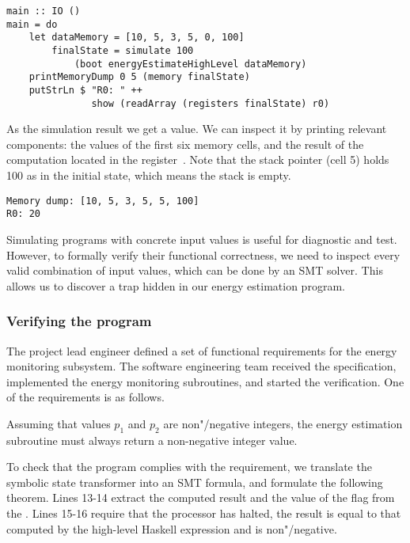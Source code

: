 \begin{verbatim}
main :: IO ()
main = do
    let dataMemory = [10, 5, 3, 5, 0, 100]
        finalState = simulate 100
            (boot energyEstimateHighLevel dataMemory)
    printMemoryDump 0 5 (memory finalState)
    putStrLn $ "R0: " ++
               show (readArray (registers finalState) r0)
\end{verbatim}

\noindent
As the simulation result we get a  value. We can inspect it by
printing relevant components: the values of the first six memory cells, and the
result of the computation located in the register~. Note that the stack
pointer (cell 5) holds 100 as in the initial state, which means the stack is empty.


\begin{verbatim}
Memory dump: [10, 5, 3, 5, 5, 100]
R0: 20
\end{verbatim}


Simulating programs with concrete input values is useful for diagnostic and test.
However, to formally verify their functional correctness, we need to inspect
every valid combination of input values, which can be done by an SMT solver.
This allows us to discover a trap hidden in our energy estimation program.


\subsubsection{Verifying the program}
The project lead engineer defined a set of functional requirements for the
energy monitoring subsystem. The software engineering team received the
specification, implemented the energy monitoring subroutines, and started the
verification. One of the requirements is as follows.

\begin{tcolorbox}

Assuming that values $p_1$ and $p_2$ are non"/negative integers, the energy
estimation subroutine must always return a non-negative integer value.

\end{tcolorbox}

To check that the program complies with the requirement, we translate the
symbolic state transformer  into an SMT formula,
and formulate the following theorem. Lines 13-14 extract the computed result and
the value of the flag  from the . Lines 15-16 require that
the processor has halted, the result is equal to that computed by the high-level
Haskell expression  and is non"/negative.


